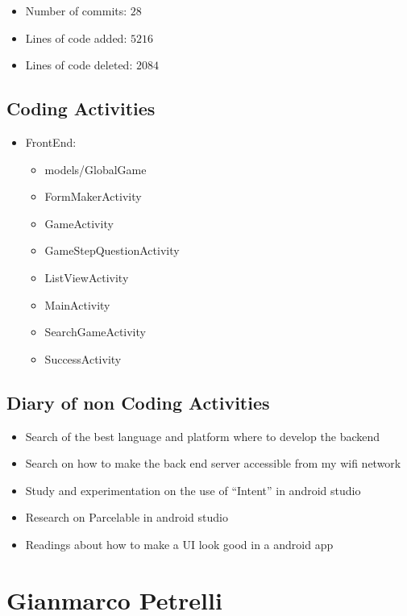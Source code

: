 \documentclass{article}
\begin{document}
\begin{itemize}
    \item Number of commits: \(28\)
    \item Lines of code added: \(5216\)
    \item Lines of code deleted: \(2084\)
\end{itemize}


\subsection{Coding Activities}

\begin{itemize}
\item FrontEnd:
    \begin{itemize}
        \item models/GlobalGame
        \item FormMakerActivity
        \item GameActivity
        \item GameStepQuestionActivity
        \item ListViewActivity
        \item MainActivity
        \item SearchGameActivity
        \item SuccessActivity
    \end{itemize}
\end{itemize}

\subsection{Diary of non Coding Activities}

\begin{itemize}
    \item Search of the best language and platform where to develop the backend
    \item Search on how to make the back end server accessible from my wifi network
    \item Study and experimentation on the use of “Intent” in android studio
    \item Research on Parcelable in android studio 
    \item Readings about how to make a UI look good in a android app
\end{itemize}

\section{Gianmarco Petrelli}
\end{document}
